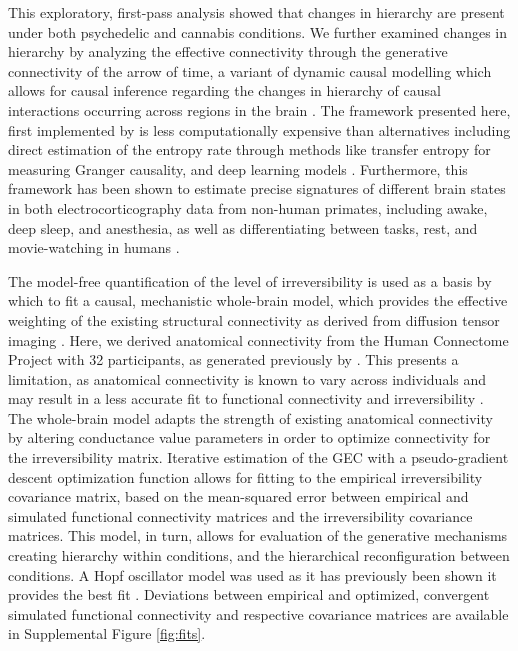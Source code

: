 This exploratory, first-pass analysis showed that changes in hierarchy
are present under both psychedelic and cannabis conditions. We further
examined changes in hierarchy by analyzing the effective connectivity
through the generative connectivity of the arrow of time, a variant of
dynamic causal modelling which allows for causal inference regarding the
changes in hierarchy of causal interactions occurring across regions in
the brain \parencite{Kringelbach2023}. The framework presented here,
first implemented by \textcite{Deco2022} is less
computationally expensive than alternatives including direct estimation
of the entropy rate through methods like transfer entropy for measuring
Granger causality, and deep learning models \parencite{Deco2021a,Lynn2021,SanzPerl2021,Seif2021}.
Furthermore, this framework has been shown to estimate precise
signatures of different brain states in both electrocorticography data
from non-human primates, including awake, deep sleep, and anesthesia, as
well as differentiating between tasks, rest, and movie-watching in
humans \parencite{Deco2022,Kringelbach2023}.

The model-free quantification of the level of irreversibility is used as
a basis by which to fit a causal, mechanistic whole-brain model, which
provides the effective weighting of the existing structural connectivity
as derived from diffusion tensor imaging \parencite{Friston2003}.
Here, we derived anatomical connectivity from the Human Connectome
Project with 32 participants, as generated previously by \textcite{Kringelbach2023}. This presents a limitation, as
anatomical connectivity is known to vary across individuals and may
result in a less accurate fit to functional connectivity and
irreversibility \parencite{Mueller2013}. The whole-brain model adapts the
strength of existing anatomical connectivity by altering conductance
value parameters in order to optimize connectivity for the
irreversibility matrix. Iterative estimation of the GEC with a
pseudo-gradient descent optimization function allows for fitting to the
empirical irreversibility covariance matrix, based on the mean-squared
error between empirical and simulated functional connectivity matrices
and the irreversibility covariance matrices. This model, in turn, allows
for evaluation of the generative mechanisms creating hierarchy within
conditions, and the hierarchical reconfiguration between conditions. A
Hopf oscillator model was used as it has previously been shown it
provides the best fit \parencite{Deco2017c, Deco2019a,Deco2017b, Kringelbach2023}. Deviations between empirical and optimized, convergent
simulated functional connectivity and respective covariance matrices are
available in Supplemental Figure \ref{fig:fits}.

